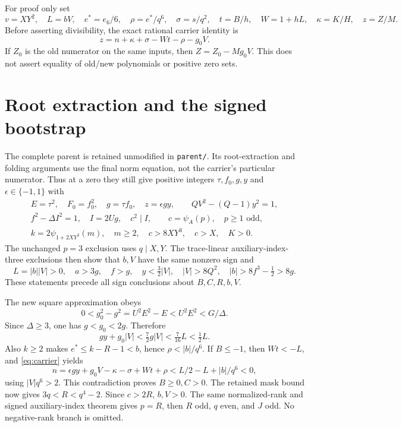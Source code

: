 For proof only set
\[
 v=XY^2,\quad L=bV,\quad e^*=e_6/6,\quad
 \rho=e^*/q^6,\quad\sigma=s/q^2,\quad t=B/h,
 \quad W=1+hL,\quad\kappa=K/H,\quad z=Z/M.
\]
Before asserting divisibility, the exact rational carrier identity is
\begin{equation}
 z=n+\kappa+\sigma-Wt-\rho-g_0V.\label{eq:carrier}
\end{equation}
If $Z_0$ is the old numerator on the same inputs, then $Z=Z_0-Mg_0V$.
This does not assert equality of old/new polynomials or positive zero sets.

\section{Root extraction and the signed bootstrap}
The complete parent is retained unmodified in \texttt{parent/}. Its
root-extraction and folding arguments use the final norm equation, not
the carrier's particular numerator. Thus at a zero they still give
positive integers $\tau,f_0,g,y$ and $\epsilon\in\{-1,1\}$ with
\begin{gather*}
 E=\tau^2,\quad F_0=f_0^2,\quad g=\tau f_0,\quad z=\epsilon gy,
 \qquad QV^2-(Q-1)y^2=1,\\
 f^2-\Delta I^2=1,\quad I=2Ug,\quad c^2\mid I,\qquad
 c=\psi_A(p),\quad p\ge1\text{ odd},\\
 k=2\psi_{1+2XY^2}(m),\quad m\ge2,\quad c>8XY^3,\quad c>X,\quad K>0.
\end{gather*}
The unchanged $p=3$ exclusion uses $q\mid X,Y$. The trace-linear
auxiliary-index-three exclusions then show that $b,V$ have the same
nonzero sign and
\begin{equation}
 L=|b||V|>0,\quad a>3g,\quad f>g,\quad
 y<\tfrac32|V|,\quad |V|>8Q^2,\quad
 |b|>8f^3-\tfrac12>8g.\label{eq:bounds}
\end{equation}
These statements precede all sign conclusions about $B,C,R,b,V$.

The new square approximation obeys
\[
 0<g_0^2-g^2=U^2E^2-E<U^2E^2<G/\Delta.
\]
Since $\Delta\ge3$, one has $g<g_0<2g$. Therefore
\begin{equation}
 gy+g_0|V|<\tfrac72g|V|<\tfrac7{16}L<\tfrac12L.\label{eq:sign}
\end{equation}
Also $k\ge2$ makes $e^*\le k-R-1<b$, hence $\rho<|b|/q^6$.
If $B\le-1$, then $Wt<-L$, and \eqref{eq:carrier} yields
\[
 n=\epsilon gy+g_0V-\kappa-\sigma+Wt+\rho
   <L/2-L+|b|/q^6<0,
\]
using $|V|q^6>2$. This contradiction proves $B\ge0,C>0$.
The retained mask bound now gives $3q<R<q^4-2$. Since $c>2R$, $b,V>0$.
The same normalized-rank and signed auxiliary-index theorem gives $p=R$,
then $R$ odd, $q$ even, and $J$ odd. No negative-rank branch is omitted.

